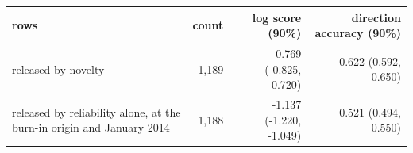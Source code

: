 \begin{tabular}{p{}rrr}
\toprule
rows & count & log score (90\%) & direction accuracy (90\%) \\
\midrule
released by novelty & 1,189 & -0.769 (-0.825, -0.720) & 0.622 (0.592, 0.650) \\
released by reliability alone, at the burn-in origin and January 2014 & 1,188 & -1.137 (-1.220, -1.049) & 0.521 (0.494, 0.550) \\
\midrule

\end{tabular}
